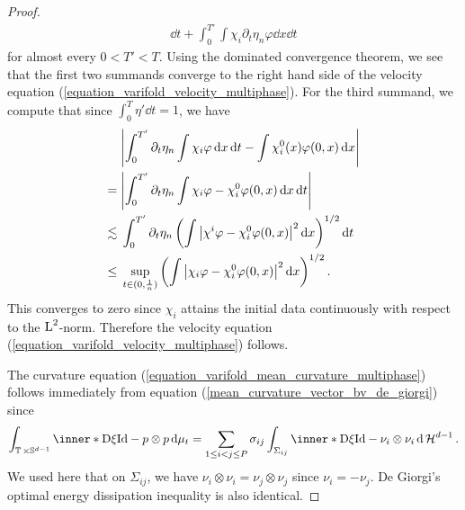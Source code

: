 \begin{proof}
\begin{align*}
		\dd{ t }
		+
		\int_{ 0 }^{ T' }
		\int
		\chi_{ i }
		\partial_{ t } \eta_{ n }
		\varphi
		\dd{ x }
		\dd{ t }
	\end{align*}
	for almost every $ 0 < T' < T $.
	Using the dominated convergence theorem, we see that the first two summands 
	converge to the right hand side of the velocity equation 
	(\ref{equation_varifold_velocity_multiphase}). For the third summand, we 
	compute that since $ \int_{ 0 }^{ T } \eta' \dd{ t } = 1 $, we have
	\begin{align*}
		& \abs{
			\int_{ 0 }^{ T' }
			\partial_{ t } \eta_{ n }
			\int
			\chi_{ i }
			\varphi
			\dd{ x }
			\dd{t}
			-
			\int
			\chi^{ 0 }_{ i } ( x )
			\varphi ( 0 , x )
			\dd{ x }
		}
		\\
		={} &
		\abs{ 
			\int_{ 0 }^{ T' }
			\partial_{ t } \eta_{ n }
			\int
			\chi_{ i }
			\varphi
			-
			\chi^{ 0 }_{ i }
			\varphi ( 0 , x )
			\dd{ x }
			\dd{ t }
		}
		\\
		\lesssim{} &
		\int_{ 0 }^{ T' } 
		\partial_{ t } \eta_{ n }
		\left(
		\int
		\abs{ \chi^{ i } \varphi - \chi^{ 0 }_{ i } \varphi ( 0 , x 
			) 
		}^{ 2 }
		\dd{ x }
		\right)^{ 1/2 }
		\dd{ t }
		\\
		\leq {} &
		\sup_{ t \in ( 0, \frac{ 1 }{ n } ) }
			\left(
				\int
					\abs{ \chi_{ i } \varphi - \chi_{ i }^{ 0 } \varphi ( 0 , x 
					) }^{ 2 }
				\dd{ x }
			\right)^{ 1/2 }.
	\end{align*}
	This converges to zero since $ \chi_{ i } $ attains the initial data 
	continuously with respect to the $ \operatorname{L}^{ 2 } $-norm. Therefore the velocity 
	equation 
	(\ref{equation_varifold_velocity_multiphase}) follows.
	
	The curvature equation (\ref{equation_varifold_mean_curvature_multiphase}) 
	follows 
	immediately from equation (\ref{mean_curvature_vector_bv_de_giorgi})
	since
	\begin{equation*}
		\int_{ \flattorus \times \mathbb{ S }^{ d - 1 } }
		\inner*{ \diff \xi }{ \mathrm{Id} - p \otimes p }
		\dd{ \mu_{ t } }
		=
		\sum_{ 1 \leq i < j \leq P }
		\sigma_{ i j }
		\int_{ \Sigma_{ i j } }
		\inner*{ \diff \xi }{\mathrm{Id} - \nu_{i } \otimes \nu_{ i } }
		\dd{ \hm^{ d - 1 } }.
	\end{equation*}
	We used here that on $ \Sigma_{ i j } $, 
	we have $ \nu_{i } \otimes \nu_{ i } = \nu_{ j } \otimes \nu_{ j } $
	since $ \nu_{ i } = - \nu_{j } $.
	De Giorgi's optimal energy dissipation inequality is also identical.
	

\end{proof}
